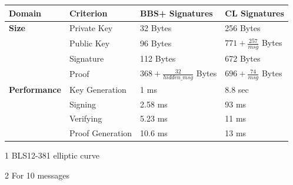     	\begin{center}
        		\begin{threeparttable}
            		\begin{tabular}{llll}
            			\hline 
            			Domain & Criterion & BBS+ Signatures\tnote{1} & CL Signatures\tabularnewline
            			\hline 
            			\textbf{Size} & Private Key & 32 Bytes  & 256 Bytes\tabularnewline
            			              & Public Key  & 96 Bytes  & \begin{math}771 + \frac{257}{msg}\end{math} Bytes\tabularnewline
            			              & Signature   & 112 Bytes & 672 Bytes\tabularnewline
            			              & Proof       & \begin{math}368 + \frac{32}{hidden\_msg}\end{math} Bytes & \begin{math}696 + \frac{74}{msg}\end{math} Bytes\tabularnewline
            			              
            			\textbf{Performance} & Key Generation            & 1 ms    & 8.8 sec\tabularnewline
            			                     & Signing\tnote{2}          & 2.58 ms & 93 ms\tabularnewline
            			                     & Verifying\tnote{2}        & 5.23 ms & 11 ms\tabularnewline
            			                     & Proof Generation\tnote{2} & 10.6 ms & 13 ms\tabularnewline
            			\hline 
            		\end{tabular}
        
        		\begin{tablenotes}\footnotesize 
        			\item[1] BLS12-381 elliptic curve
        			\item[2] For 10 messages
        		\end{tablenotes}
        	\end{threeparttable}
        	\label{tab: comparison bbs+ and cl}
    	\end{center} 
		
